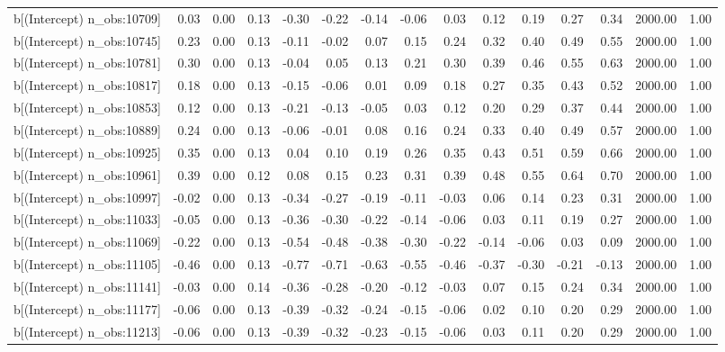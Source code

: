 \begin{table}[ht]
\begin{tabular}{rrrrrrrrrrrrrrr}
  b[(Intercept) n\_obs:10709] & 0.03 & 0.00 & 0.13 & -0.30 & -0.22 & -0.14 & -0.06 & 0.03 & 0.12 & 0.19 & 0.27 & 0.34 & 2000.00 & 1.00 \\ 
  b[(Intercept) n\_obs:10745] & 0.23 & 0.00 & 0.13 & -0.11 & -0.02 & 0.07 & 0.15 & 0.24 & 0.32 & 0.40 & 0.49 & 0.55 & 2000.00 & 1.00 \\ 
  b[(Intercept) n\_obs:10781] & 0.30 & 0.00 & 0.13 & -0.04 & 0.05 & 0.13 & 0.21 & 0.30 & 0.39 & 0.46 & 0.55 & 0.63 & 2000.00 & 1.00 \\ 
  b[(Intercept) n\_obs:10817] & 0.18 & 0.00 & 0.13 & -0.15 & -0.06 & 0.01 & 0.09 & 0.18 & 0.27 & 0.35 & 0.43 & 0.52 & 2000.00 & 1.00 \\ 
  b[(Intercept) n\_obs:10853] & 0.12 & 0.00 & 0.13 & -0.21 & -0.13 & -0.05 & 0.03 & 0.12 & 0.20 & 0.29 & 0.37 & 0.44 & 2000.00 & 1.00 \\ 
  b[(Intercept) n\_obs:10889] & 0.24 & 0.00 & 0.13 & -0.06 & -0.01 & 0.08 & 0.16 & 0.24 & 0.33 & 0.40 & 0.49 & 0.57 & 2000.00 & 1.00 \\ 
  b[(Intercept) n\_obs:10925] & 0.35 & 0.00 & 0.13 & 0.04 & 0.10 & 0.19 & 0.26 & 0.35 & 0.43 & 0.51 & 0.59 & 0.66 & 2000.00 & 1.00 \\ 
  b[(Intercept) n\_obs:10961] & 0.39 & 0.00 & 0.12 & 0.08 & 0.15 & 0.23 & 0.31 & 0.39 & 0.48 & 0.55 & 0.64 & 0.70 & 2000.00 & 1.00 \\ 
  b[(Intercept) n\_obs:10997] & -0.02 & 0.00 & 0.13 & -0.34 & -0.27 & -0.19 & -0.11 & -0.03 & 0.06 & 0.14 & 0.23 & 0.31 & 2000.00 & 1.00 \\ 
  b[(Intercept) n\_obs:11033] & -0.05 & 0.00 & 0.13 & -0.36 & -0.30 & -0.22 & -0.14 & -0.06 & 0.03 & 0.11 & 0.19 & 0.27 & 2000.00 & 1.00 \\ 
  b[(Intercept) n\_obs:11069] & -0.22 & 0.00 & 0.13 & -0.54 & -0.48 & -0.38 & -0.30 & -0.22 & -0.14 & -0.06 & 0.03 & 0.09 & 2000.00 & 1.00 \\ 
  b[(Intercept) n\_obs:11105] & -0.46 & 0.00 & 0.13 & -0.77 & -0.71 & -0.63 & -0.55 & -0.46 & -0.37 & -0.30 & -0.21 & -0.13 & 2000.00 & 1.00 \\ 
  b[(Intercept) n\_obs:11141] & -0.03 & 0.00 & 0.14 & -0.36 & -0.28 & -0.20 & -0.12 & -0.03 & 0.07 & 0.15 & 0.24 & 0.34 & 2000.00 & 1.00 \\ 
  b[(Intercept) n\_obs:11177] & -0.06 & 0.00 & 0.13 & -0.39 & -0.32 & -0.24 & -0.15 & -0.06 & 0.02 & 0.10 & 0.20 & 0.29 & 2000.00 & 1.00 \\ 
  b[(Intercept) n\_obs:11213] & -0.06 & 0.00 & 0.13 & -0.39 & -0.32 & -0.23 & -0.15 & -0.06 & 0.03 & 0.11 & 0.20 & 0.29 & 2000.00 & 1.00 \\ 

\end{tabular}
\end{table}
